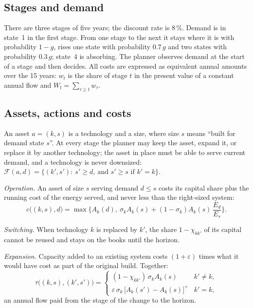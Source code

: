 \documentclass[11pt,a4paper]{article}
\begin{document}
\subsection{Stages and demand}
There are three stages of five years; the discount rate is 8\,\%. Demand is in state~1 in the first stage. From one
stage to the next it stays where it is with probability $1-g$, rises one state with probability $0.7\,g$ and two
states with probability $0.3\,g$; state~4 is absorbing. The planner observes demand at the start of a stage and
then decides. All costs are expressed as equivalent annual amounts over the 15 years: $w_t$ is the share of stage
$t$ in the present value of a constant annual flow and $W_t=\sum_{\tau\ge t}w_\tau$.

\subsection{Assets, actions and costs}
An asset $a=(k,s)$ is a technology and a size, where size $s$ means ``built for demand state $s$''. At every stage
the planner may keep the asset, expand it, or replace it by another technology; the asset in place must be able to
serve current demand, and a technology is never downsized:
$\mathcal F(a,d)=\{(k',s'):\ s'\ge d,\ \text{and } s'\ge s \text{ if } k'=k\}$.

\emph{Operation.} An asset of size $s$ serving demand $d\le s$ costs its capital share plus the running cost of the
energy served, and never less than the right-sized system:
\begin{equation}
c\big((k,s),d\big)=\max\Big\{A_k(d),\ \sigma_kA_k(s)+(1-\sigma_k)A_k(s)\,\frac{E_d}{E_s}\Big\}.
\end{equation}

\emph{Switching.} When technology $k$ is replaced by $k'$, the share $1-\chi_{kk'}$ of its capital cannot be reused
and stays on the books until the horizon.

\emph{Expansion.} Capacity added to an existing system costs $(1+\varepsilon)$ times what it would have cost as part
of the original build. Together:
\begin{equation}
\tau\big((k,s),(k',s')\big)=
\begin{cases}
(1-\chi_{kk'})\,\sigma_kA_k(s) & k'\neq k,\\
\varepsilon\,\sigma_k\,\big[A_k(s')-A_k(s)\big]^+ & k'=k,
\end{cases}
\end{equation}
an annual flow paid from the stage of the change to the horizon.
\end{document}

